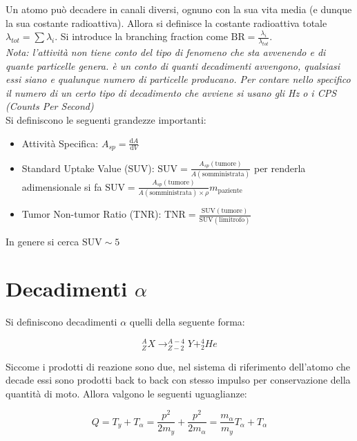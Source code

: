 \documentclass [a4paper, twoside] {book}
\begin{document}
Un atomo può decadere in canali diversi, ognuno con la sua vita media (e dunque la sua costante radioattiva). Allora si definisce la costante radioattiva totale $\lambda_{tot}=\sum \lambda_{i}$. Si introduce la branching fraction come $\text{BR}=\frac{\lambda_i}{\lambda_{tot}}$.\\

\emph{Nota: l'attività non tiene conto del tipo di fenomeno che sta avvenendo e di quante particelle genera. è un conto di quanti decadimenti avvengono, qualsiasi essi siano e qualunque numero di particelle producano. Per contare nello specifico il numero di un certo tipo di decadimento che avviene si usano gli Hz o i CPS (Counts Per Second)}\\

Si definiscono le seguenti grandezze importanti:
\begin{itemize}
\item Attività Specifica: $A_{sp}=\frac{\mathrm{d}A}{\mathrm{d}V}$
\item Standard Uptake Value (SUV): $\text{SUV}=\frac{A_{sp}(\text{tumore})}{A(\text{somministrata})}$ per renderla adimensionale si fa $\text{SUV}=\frac{A_{sp}(\text{tumore})}{A(\text{somministrata})\times \rho}m_{\text{paziente}}$
\item Tumor Non-tumor Ratio (TNR): $\text{TNR}=\frac{\text{SUV}(\text{tumore})}{\text{SUV}(\text{limitrofo})}$
\end{itemize}

In genere si cerca $\text{SUV}\sim5$

\section{Decadimenti $\alpha$}

Si definiscono decadimenti $\alpha$ quelli della seguente forma:

\begin{equation}
^A_Z X \longrightarrow ^{A-4}_{Z-2}Y + ^4_2He
\end{equation}

Siccome i prodotti di reazione sono due, nel sistema di riferimento dell'atomo che decade essi sono prodotti back to back con stesso impulso per conservazione della quantità di moto. Allora valgono le seguenti uguaglianze:

\begin{equation}
Q=T_y+T_{\alpha}=\frac{p^2}{2m_y}+\frac{p^2}{2m_{\alpha}}=\frac{m_{\alpha}}{m_y}T_{\alpha}+T_{\alpha}
\end{equation}
\end{document}
